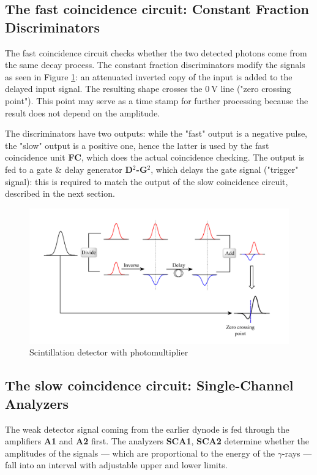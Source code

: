 \documentclass[twocolumn]{article}
\begin{document}
\subsection{The fast coincidence circuit: Constant Fraction Discriminators}
The fast coincidence circuit checks whether the two detected photons come from the same decay process. The constant fraction discriminators modify the signals as seen in Figure \ref{fig:cfd}: an attenuated inverted copy of the input is added to the delayed input signal. The resulting shape crosses the $\SI{0}{\volt}$ line ("zero crossing point"). This point may serve as a time stamp for further processing because the result does not depend on the amplitude.
\par The discriminators have two outputs: while the "fast" output is a negative pulse, the "slow" output is a positive one, hence the latter is used by the fast coincidence unit \textbf{FC}, which does the actual coincidence checking. The output is fed to a gate $\&$ delay generator \textbf{D$^2$-G$^2$}, which delays the gate signal ("trigger" signal): this is required to match the output of the slow coincidence circuit, described in the next section.
\begin{figure}[!h]
\centering
\includegraphics[width=1.2\linewidth]{cfd.png}
\caption{Scintillation detector with photomultiplier \cite{cfd}} 
\label{fig:cfd}
\end{figure}
\subsection{The slow coincidence circuit: Single-Channel Analyzers}
The weak detector signal coming from the earlier dynode is fed through the amplifiers \textbf{A1} and \textbf{A2} first. The analyzers \textbf{SCA1}, \textbf{SCA2} determine whether the amplitudes of the signals --- which are proportional to the energy of the $\gamma$-rays --- fall into an interval with adjustable upper and lower limits.
\end{document}
